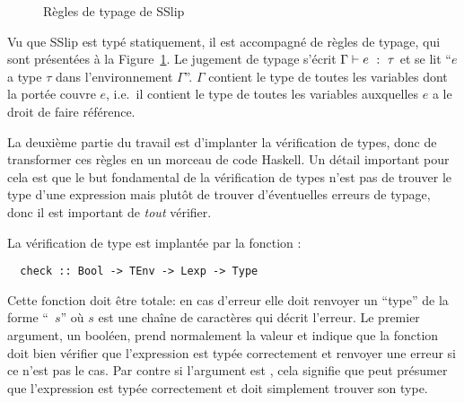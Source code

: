 \documentclass{article}
\begin{document}
\begin{figure}
  \begin{minipage}{\columnwidth}
    \noindent \centering
          {}
          {}
          {}
          {}
     {
       {\tau}
    }
    \mbox{}
  \end{minipage}
  \caption{Règles de typage de SSlip}
  \label{fig:typing}
\end{figure}

Vu que SSlip est typé statiquement, il est accompagné de règles de typage,
qui sont présentées à la Figure~\ref{fig:typing}.  Le jugement de typage
s'écrit $\Gamma \vdash e ~:~{\tau}$ et se lit ``$e$ a type $\tau$ dans l'environnement
$\Gamma$''.  $\Gamma$ contient le type de toutes les variables dont la portée couvre
$e$, i.e.~il contient le type de toutes les variables auxquelles $e$ a le
droit de faire référence.

La deuxième partie du travail est d'implanter la vérification de types, donc
de transformer ces règles en un morceau de code Haskell.  Un détail
important pour cela est que le but fondamental de la vérification de types
n'est pas de trouver le type d'une expression mais plutôt de trouver
d'éventuelles erreurs de typage, donc il est important de
\emph{tout} vérifier.

La vérification de type est implantée par la fonction :
\begin{verbatim}
  check :: Bool -> TEnv -> Lexp -> Type
\end{verbatim}
Cette fonction doit être totale: en cas d'erreur elle doit renvoyer un
``type'' de la forme ``~$s$'' où $s$ est une chaîne de caractères
qui décrit l'erreur.  Le premier argument, un booléen, prend normalement la
valeur  et indique que la fonction doit bien vérifier que
l'expression est typée correctement et renvoyer une erreur si ce n'est pas
le cas.  Par contre si l'argument est , cela signifie que
 peut présumer que l'expression est typée correctement et doit
simplement trouver son type.
\end{document}
